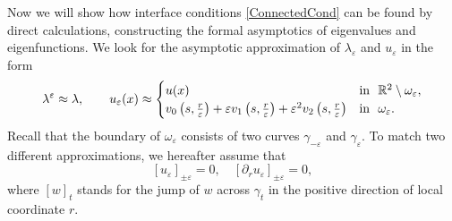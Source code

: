 \documentclass[reqno]{amsart}
\theoremstyle{plain}
\numberwithin{equation}{section}
\newcommand{\Real}{\mathbb R}
\newcommand{\eps}{\varepsilon}
\newcommand\nep{\textstyle\frac r\eps}
\begin{document}
Now we will show how interface conditions \eqref{ConnectedCond} can be found by direct calculations, constructing the formal asymptotics of  eigenvalues and eigenfunctions.
We  look for the asymptotic approximation of $\lambda_\eps$ and $u_\eps$ in the form
\begin{equation}\label{AsymptoticsUe}
\lambda^\eps\approx \lambda, \qquad u_\eps(x)\approx
\begin{cases}
  u(x)& \hbox{in \ }\Real^2\setminus \omega_\eps, \\
    v_0\left(s,\nep\right)+\eps v_1\left(s,\nep\right)+\eps^2 v_2\left(s,\nep\right)
&\hbox{in \ } \omega_\eps.
\end{cases}
\end{equation}
Recall that the boundary of $\omega_\eps$ consists of  two curves
$\gamma_{-\eps}$ and $\gamma_{\eps}$.
To match two different approximations, we hereafter assume that
\begin{equation}\label{MatchingCnds}
  [u_\eps]_{\pm\eps}=0, \quad [\partial_r u_\eps]_{\pm\eps}=0,
\end{equation}
where  $[w]_t$ stands for  the jump of $w$ across $\gamma_t$ in the positive direction of local coordinate $r$.
\end{document}
